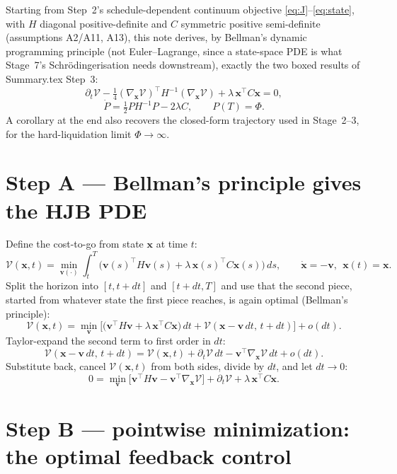 \documentclass[11pt,a4paper]{article}
\begin{document}
Starting from Step~2's schedule-dependent continuum objective
\eqref{eq:J}--\eqref{eq:state},
with $H$ diagonal positive-definite and $C$ symmetric positive semi-definite
(assumptions A2/A11, A13), this note derives, by Bellman's dynamic
programming principle (not Euler--Lagrange, since a state-space PDE is what
Stage~7's Schr\"odingerisation needs downstream), exactly the two boxed
results of Summary.tex Step~3:
\begin{equation}
\partial_t\mathcal V-\tfrac14(\nabla_{\mathbf x}\mathcal V)^\top H^{-1}
(\nabla_{\mathbf x}\mathcal V)+\lambda\,\mathbf x^\top C\mathbf x=0,
\label{eq:hjb}
\end{equation}
\begin{equation}
\dot P=\tfrac12PH^{-1}P-2\lambda C,\qquad P(T)=\Phi.
\label{eq:ric}
\end{equation}
A corollary at the end also recovers the closed-form trajectory used in
Stage~2--3, for the hard-liquidation limit $\Phi\to\infty$.

\section*{Step A --- Bellman's principle gives the HJB PDE}

Define the cost-to-go from state $\mathbf x$ at time $t$:
\[
\mathcal V(\mathbf x,t)=\min_{\mathbf v(\cdot)}\int_t^T\big(\mathbf
v(s)^\top H\mathbf v(s)+\lambda\,\mathbf x(s)^\top C\mathbf x(s)\big)\,ds,
\qquad \dot{\mathbf x}=-\mathbf v,\ \ \mathbf x(t)=\mathbf x .
\]
Split the horizon into $[t,t+dt]$ and $[t+dt,T]$ and use that the second
piece, started from whatever state the first piece reaches, is again optimal
(Bellman's principle):
\[
\mathcal V(\mathbf x,t)=\min_{\mathbf v}\Big[\big(\mathbf v^\top H\mathbf
v+\lambda\,\mathbf x^\top C\mathbf x\big)\,dt+\mathcal V(\mathbf x-\mathbf
v\,dt,\,t+dt)\Big]+o(dt).
\]
Taylor-expand the second term to first order in $dt$:
\[
\mathcal V(\mathbf x-\mathbf v\,dt,\,t+dt)=\mathcal V(\mathbf x,t)+\partial_t
\mathcal V\,dt-\mathbf v^\top\nabla_{\mathbf x}\mathcal V\,dt+o(dt).
\]
Substitute back, cancel $\mathcal V(\mathbf x,t)$ from both sides, divide by
$dt$, and let $dt\to0$:
\begin{equation}
0=\min_{\mathbf v}\Big[\mathbf v^\top H\mathbf v-\mathbf
v^\top\nabla_{\mathbf x}\mathcal V\Big]+\partial_t\mathcal V+\lambda\,\mathbf
x^\top C\mathbf x.
\label{eq:pre-hjb}
\end{equation}

\section*{Step B --- pointwise minimization: the optimal feedback control}
\end{document}
